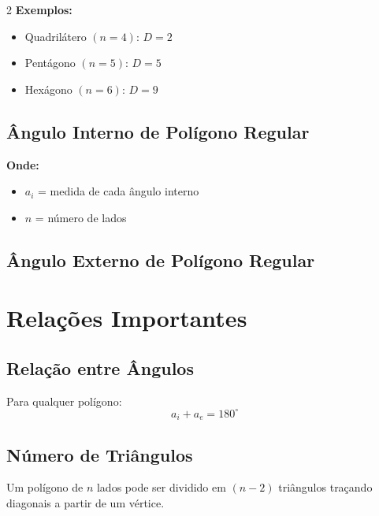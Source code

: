 \documentclass[11pt]{article}
\begin{document}
\begin{multicols}{2}
\textbf{Exemplos:}
\begin{itemize}
\item Quadrilátero $(n=4)$: $D = 2$
\item Pentágono $(n=5)$: $D = 5$
\item Hexágono $(n=6)$: $D = 9$
\end{itemize}

\subsection*{Ângulo Interno de Polígono Regular}


\textbf{Onde:}
\begin{itemize}
\item $a_i$ = medida de cada ângulo interno
\item $n$ = número de lados
\end{itemize}

\subsection*{Ângulo Externo de Polígono Regular}


\section*{Relações Importantes}

\subsection*{Relação entre Ângulos}
Para qualquer polígono:
\[
a_i + a_e = 180^\circ
\]

\subsection*{Número de Triângulos}
Um polígono de $n$ lados pode ser dividido em $(n-2)$ triângulos traçando diagonais a partir de um vértice.


\end{multicols}
\end{document}
